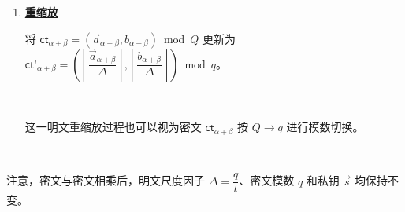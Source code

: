 \begin{tcolorbox}[title={\textbf{\tboxlabel{\ref*{subsubsec:bfv-mult-cipher-tfhe}} 分层 LWE 张量乘法}}]
\begin{enumerate}
$ \textsf{ct}_\alpha = (d
_1, d_0)$

$ \textsf{ct}_\beta = \bm{\langle} \textsf{Decomp}^{\beta, l}(\vec{d}_2), \text{ } \textsf{Lev}_{\vec{s}, \sigma}^{\beta, l}(\vec{s}^{\otimes}) \bm{\rangle}$.

$ \textsf{ct}_{\alpha + \beta} = \textsf{ct}_{\alpha} + \textsf{ct}_{\beta}$

$ $

于是，以下性质成立：

$\phi_{+}(\textsf{ct}_{\alpha+\beta})\equiv(\Delta m^{\langle1\rangle}+e^{\langle1\rangle}+qk_1)(\Delta m^{\langle2\rangle}+e^{\langle2\rangle}+qk_2)+e_{\rm rl}\pmod Q$，其中 $\phi_+(\vec a,b)=b+\langle\vec a,\vec s\rangle$。

$ $




\item \textbf{\underline{重缩放}}

将 $\textsf{ct}_{\alpha + \beta} = (\vec{a}_{\alpha + \beta}, b_{\alpha + \beta}) \bmod Q$ 更新为 $\textsf{ct'}_{\alpha + \beta} = \left(\left\lceil\dfrac{\vec{a}_{\alpha + \beta}}{\Delta}\right\rfloor, \left\lceil\dfrac{b_{\alpha + \beta}}{\Delta}\right\rfloor\right) \bmod q$。

$ $

这一明文重缩放过程也可以视为密文 $\textsf{ct}_{\alpha + \beta}$ 按 $Q \rightarrow q$ 进行模数切换。


$ $

\end{enumerate}

注意，密文与密文相乘后，明文尺度因子 $\Delta=\dfrac{q}{t}$、密文模数 $q$ 和私钥 $\vec{s}$ 均保持不变。



\end{tcolorbox}




